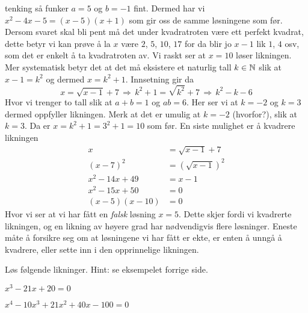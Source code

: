 \documentclass[a4paper,11pt]{article}
\begin{document}
\begin{solution}
  tenking så funker $a = 5$ og $b = -1$ fint.  Dermed har vi
  $x^2-4x-5=(x-5)(x+1)$ som gir oss de samme løsningene som før.\\
  Dersom svaret skal bli pent må det under kvadratroten være ett perfekt
  kvadrat, dette betyr vi kan prøve å la $x$ være $2$, $5$, $10$, $17$ for
  da blir jo $x-1$ lik $1$, $4$ osv, som det er enkelt å ta kvadratroten av.
  Vi raskt ser at $x = 10$ løser likningen. Mer systematisk betyr det at det
  må eksistere et naturlig tall $k \in \mathbb{N}$ slik at $x-1=k^2$ og dermed $x =
  k^2 + 1$. Innsetning gir da
  \begin{equation*}
    x = \sqrt{x - 1} + 7
    \, \Rightarrow \,
    k^2 + 1 = \sqrt{k^2} + 7 
    \, \Rightarrow \,
    k^2 - k - 6
  \end{equation*}
  Hvor vi trenger to tall slik at $a+b = 1$ og $ab = 6$. Her ser vi at $k = -2$
  og $k = 3$ dermed oppfyller likningen. Merk at det er umulig at $k = -2$
  (hvorfor?), slik at $k = 3$. Da er $x = k^2 + 1 = 3^2 + 1 = 10$ som før.  En
  siste mulighet er å kvadrere likningen
  \begin{align*}
                  x &=  \sqrt{x - 1} + 7 \\
          (x - 7)^2 &= (\sqrt{x - 1})^2 \\
     x^2 - 14x + 49 &= x - 1 \\
     x^2 - 15x + 50 &= 0 \\
    (x - 5)(x - 10) &= 0
  \end{align*}
  Hvor vi ser at vi har fått en \emph{falsk} løsning $x = 5$. Dette skjer fordi
  vi kvadrerte likningen, og en likning av høyere grad har nødvendigvis flere
  løsninger. Eneste måte å forsikre seg om at løsningene vi har fått er ekte, er
  enten å unngå å kvadrere, eller sette inn i den opprinnelige likningen.
\end{solution}


\begin{problem}
  Løs følgende likninger. Hint: se eksempelet forrige side.
  \begin{subproblem}
    \label{subproblem:1.9-3a-oving-02-2019-MAT-0001}
    $x^3 - 21x + 20 = 0$ 
  \end{subproblem}
  \begin{subproblem}
    \label{subproblem:1.9-3b-oving-02-2019-MAT-0001}
    $x^4 - 10x^3 + 21x^2 + 40x - 100=0$ 
  \end{subproblem}
\end{problem}
\end{document}
